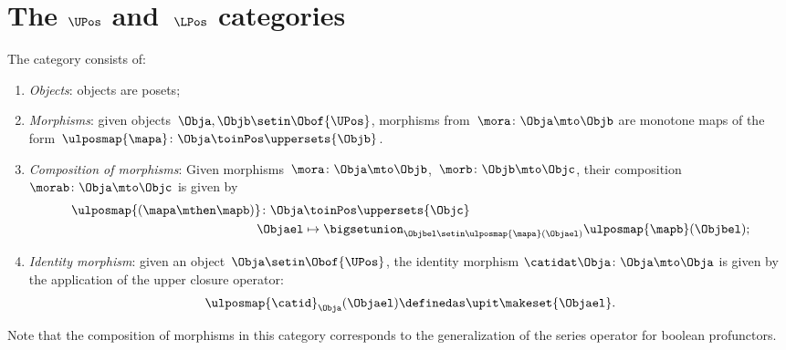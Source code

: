 \section{The $\UPos$ and~$\LPos$ categories}

\begin{definition}
    \label{def:upos_cat}
    The category \UPos consists of:
    \begin{enumerate}
        \item \emph{Objects}: objects are posets;
        \item \emph{Morphisms}: given objects~$\Obja,\Objb\setin \Obof{\UPos}$, morphisms from~$\mora\colon \Obja \mto \Objb$ are monotone maps of the form~$\ulposmap{\mapa} \colon \Obja \toinPos \uppersets{\Objb}$.
        \item \emph{Composition of morphisms}: Given morphisms~$\mora\colon \Obja \mto \Objb$,~$\morb\colon \Objb\mto \Objc$, their composition~$\morab\colon \Obja\mto \Objc$ is given by
              \begin{equation}
                  \begin{aligned}
                      \ulposmap{(\mapa \mthen \mapb)} \colon \Obja & \toinPos \uppersets{\Objc} \\
                      \Objael                                      & \mapsto \bigsetunion_{\Objbel\setin \ulposmap{\mapa}(\Objael)}\ulposmap{\mapb}(\Objbel);
                  \end{aligned}
              \end{equation}
        \item \emph{Identity morphism}: given an object~$\Obja\setin \Obof{\UPos}$, the identity morphism $\catidat\Obja \colon \Obja \mto \Obja$ is given by the application of the upper closure operator:
              \begin{equation}
                  \ulposmap{\catid}_\Obja(\Objael)\definedas \upit\makeset{\Objael}.
              \end{equation}
    \end{enumerate}
\end{definition}

\begin{remark}
    Note that the composition of morphisms in this category corresponds to the generalization of the series operator for boolean profunctors.
\end{remark}

